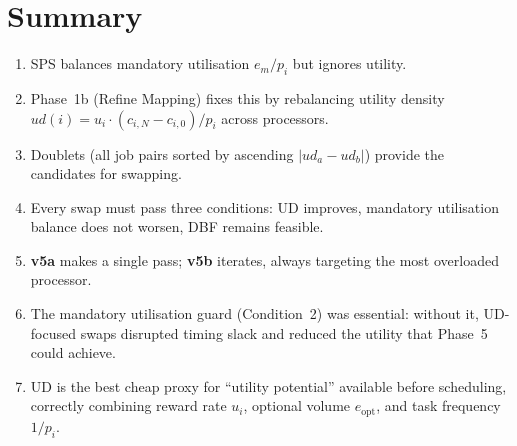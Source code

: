 \documentclass[10pt,twocolumn]{article}
\begin{document}
\section{Summary}

\begin{enumerate}[nosep]
  \item SPS balances mandatory utilisation $e_m/p_i$ but ignores utility.
  \item Phase~1b (Refine Mapping) fixes this by rebalancing utility density
        $ud(i) = u_i \cdot (c_{i,N} - c_{i,0}) / p_i$ across processors.
  \item Doublets (all job pairs sorted by ascending $|ud_a - ud_b|$)
        provide the candidates for swapping.
  \item Every swap must pass three conditions: UD improves, mandatory
        utilisation balance does not worsen, DBF remains feasible.
  \item \textbf{v5a} makes a single pass; \textbf{v5b} iterates,
        always targeting the most overloaded processor.
  \item The mandatory utilisation guard (Condition~2) was essential:
        without it, UD-focused swaps disrupted timing slack and reduced
        the utility that Phase~5 could achieve.
  \item UD is the best cheap proxy for ``utility potential'' available
        before scheduling, correctly combining reward rate $u_i$,
        optional volume $e_{\text{opt}}$, and task frequency $1/p_i$.
\end{enumerate}
\end{document}
